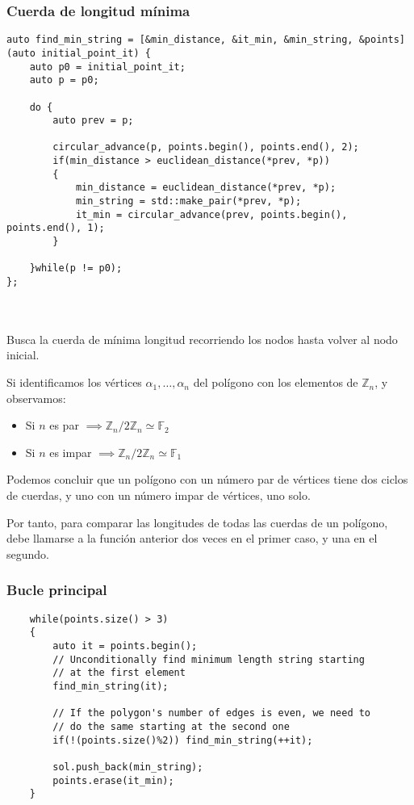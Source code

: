 \documentclass[compress]{beamer}
\begin{document}
\begin{frame}[fragile]
	\frametitle{Cuerda de longitud mínima}
        \begin{adjustbox}{width=10cm}
        
\begin{lstlisting}[basicstyle= \tiny,]
auto find_min_string = [&min_distance, &it_min, &min_string, &points](auto initial_point_it) {
    auto p0 = initial_point_it;
    auto p = p0;
    
    do {
        auto prev = p;
        
        circular_advance(p, points.begin(), points.end(), 2);
        if(min_distance > euclidean_distance(*prev, *p))
        {
            min_distance = euclidean_distance(*prev, *p);
            min_string = std::make_pair(*prev, *p);
            it_min = circular_advance(prev, points.begin(), points.end(), 1);
        }
      
    }while(p != p0);
};
\end{lstlisting}
\end{adjustbox}\hfill\\\hfill\\
	Busca la cuerda de mínima longitud recorriendo los nodos hasta volver al nodo inicial.
\end{frame}

\begin{frame}
Si identificamos los vértices $\alpha_1,\dots,\alpha_n$ del polígono con los elementos de $\mathbb{Z}_n$, y observamos:
\begin{itemize}
\item Si $n$ es par $\implies \mathbb{Z}_n/2\mathbb{Z}_n \simeq \mathbb{F}_2$
\item Si $n$ es impar $\implies \mathbb{Z}_n/2\mathbb{Z}_n \simeq \mathbb{F}_1$
\end{itemize}

Podemos concluir que un polígono con un número par de vértices tiene dos ciclos de cuerdas, y uno con un número impar de vértices, uno solo.

Por tanto, para comparar las longitudes de todas las cuerdas de un polígono, debe llamarse a la función anterior dos veces en el primer caso, y una en el segundo.
\end{frame}

\begin{frame}[fragile]
	\frametitle{Bucle principal}
	\begin{lstlisting}
	while(points.size() > 3)
	{
		auto it = points.begin();
		// Unconditionally find minimum length string starting
		// at the first element
		find_min_string(it);
	
		// If the polygon's number of edges is even, we need to
		// do the same starting at the second one
		if(!(points.size()%2)) find_min_string(++it);
	
		sol.push_back(min_string);
		points.erase(it_min);
	}
	\end{lstlisting}
	
\end{frame}
\end{document}
